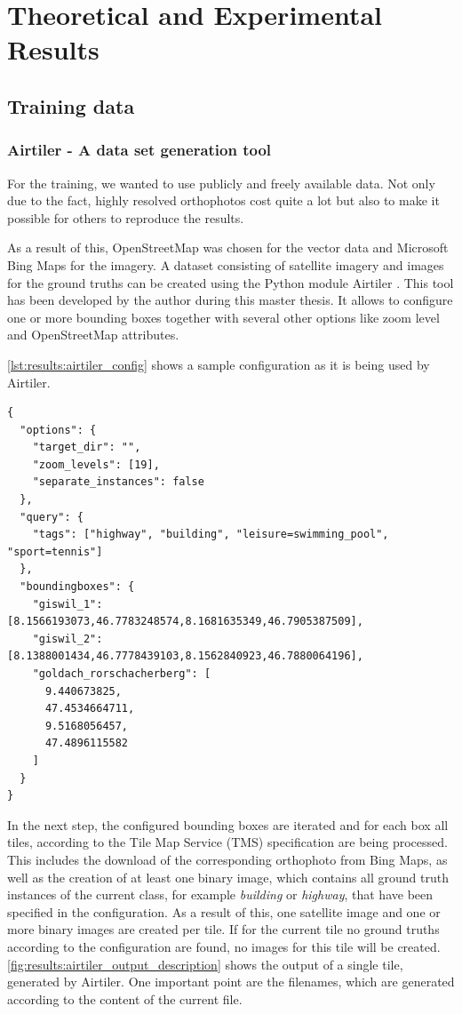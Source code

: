 
\chapter{Theoretical and Experimental Results}
\section{Training data}
\subsection{Airtiler - A data set generation tool}
For the training, we wanted to use publicly and freely available data. Not only due to the fact, highly resolved orthophotos cost quite a lot but also to make it possible for others to reproduce the results.

As a result of this, OpenStreetMap was chosen for the vector data and Microsoft Bing Maps for the imagery. A dataset consisting of satellite imagery and images for the ground truths can be created using the Python module Airtiler \cite{airtiler}. This tool has been developed by the author during this master thesis. It allows to configure one or more bounding boxes together with several other options like zoom level and OpenStreetMap attributes.

\autoref{lst:results:airtiler_config} shows a sample configuration as it is being used by Airtiler.

\begin{minipage}{\linewidth}
\begin{lstlisting}[caption={Sample configuration for Airtiler},captionpos=b,label=lst:results:airtiler_config]
{
  "options": {
    "target_dir": "",
    "zoom_levels": [19],
    "separate_instances": false
  },
  "query": {
    "tags": ["highway", "building", "leisure=swimming_pool", "sport=tennis"]
  },
  "boundingboxes": {
    "giswil_1": [8.1566193073,46.7783248574,8.1681635349,46.7905387509],
    "giswil_2": [8.1388001434,46.7778439103,8.1562840923,46.7880064196],
    "goldach_rorschacherberg": [
      9.440673825,
      47.4534664711,
      9.5168056457,
      47.4896115582
    ]
  }
}
\end{lstlisting}
\end{minipage}

In the next step, the configured bounding boxes are iterated and for each box all tiles, according to the Tile Map Service (TMS) specification \cite{tmsspec} are being processed. This includes the download of the corresponding orthophoto from Bing Maps, as well as the creation of at least one binary image, which contains all ground truth instances of the current class, for example \textit{building} or \textit{highway}, that have been specified in the configuration. As a result of this, one satellite image and one or more binary images are created per tile. If for the current tile no ground truths according to the configuration are found, no images for this tile will be created. \autoref{fig:results:airtiler_output_description} shows the output of a single tile, generated by Airtiler. One important point are the filenames, which are generated according to the content of the current file.


